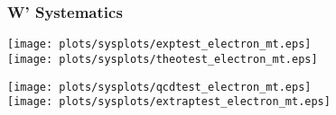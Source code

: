 \begin{frame}
	\frametitle{W' Systematics}
		\begin{center}
		\texttt{[image: plots/sysplots/exptest\_electron\_mt.eps]}\\
		\texttt{[image: plots/sysplots/theotest\_electron\_mt.eps]}	
		\end{center}
		\begin{center}
		\texttt{[image: plots/sysplots/qcdtest\_electron\_mt.eps]}\\
		\texttt{[image: plots/sysplots/extraptest\_electron\_mt.eps]}	
		\end{center}
	\cend
\end{frame}